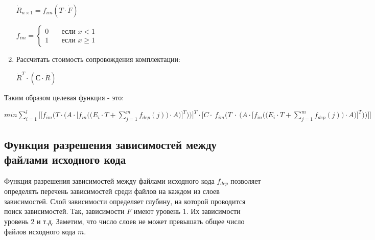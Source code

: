 \begin{enumerate}
  \begin{center}
    $\dot{R}_{n \times 1} = f_{im}(T \cdot \dot{F})$
  \end{center}
  \begin{center}
    $
    f_{im} =
    \begin{cases}
      0 & \quad \text{если } x < 1 \\
      1 & \quad \text{если } x \geq 1
    \end{cases}
    $
  \end{center}
  \item Рассчитать стоимость сопровождения комплектации:
  \begin{center}
    $\dot{R}^{T} \cdot (С \cdot \dot{R})$
  \end{center}
\end{enumerate}

Таким образом целевая функция - это:
  \begin{center}
    $\displaystyle min \sum^{l}_{i = 1} \Bigg[\Bigg[f_{im}\Bigg(T \cdot \bigg(A \cdot \bigg[f_{in}\Big(\big(E_{i} \cdot T + \sum^{m}_{j = 1}f_{dep}(j)\big) \cdot A\Big)\bigg]^{T}\bigg)\Bigg)\Bigg]^{T} \cdot \Bigg[C \cdot~f_{im}\Bigg(T~\cdot~\bigg(A \cdot \bigg[f_{in}\Big(\big(E_{i} \cdot T + \sum^{m}_{j = 1}f_{dep}(j)\big) \cdot A\Big)\bigg]^{T}\bigg)\Bigg)\Bigg]\Bigg]$
  \end{center}

\subsection*{Функция разрешения зависимостей между файлами исходного кода}
Функция разрешения зависимостей между файлами исходного кода $f_{dep}$ позволяет определять перечень зависимостей среди файлов на каждом из слоев зависимостей. Слой зависимости определяет глубину, на которой проводится поиск зависимостей. Так, зависимости $F$ имеют уровень $1$. Их зависимости уровень $2$ и т.д. Заметим, что число слоев не может превышать общее число файлов исходного кода $m$.

